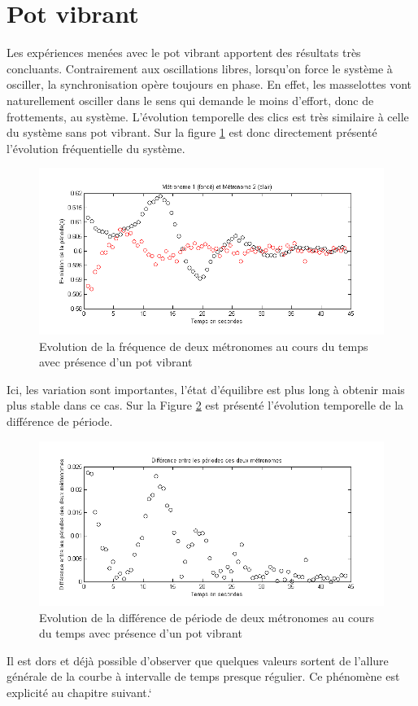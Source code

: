\documentclass[a4paper,11pt]{report}
\begin{document}
\section{Pot vibrant}
Les expériences menées avec le pot vibrant apportent des résultats très concluants. Contrairement aux oscillations libres, lorsqu'on force le système à osciller, la synchronisation opère toujours en phase. En effet, les masselottes vont naturellement osciller dans le sens qui demande le moins d'effort, donc de frottements, au système. L'évolution temporelle des clics est très similaire à celle du système sans pot vibrant. Sur la figure \ref{SynchroFP} est donc directement présenté l'évolution fréquentielle du système.
\begin{figure}[h]
\centering
\includegraphics[width=1\textwidth]{PotVibrant_Synchro_Frequence_200BPM}
\caption{Evolution de la fréquence de deux métronomes au cours du temps avec présence d'un pot vibrant}
\label{SynchroFP}
\end{figure}
Ici, les variation sont importantes, l'état d'équilibre est plus long à obtenir mais plus stable dans ce cas. Sur la Figure \ref{SynchroPP} est présenté l'évolution temporelle de la différence de période.
\begin{figure}[!h]
\centering
\includegraphics[width=1\textwidth]{PotVibrant_Synchro_Periode_200BPM}
\caption{Evolution de la différence de période de deux métronomes au cours du temps avec présence d'un pot vibrant}
\label{SynchroPP}
\end{figure}
Il est dors et déjà possible d'observer que quelques valeurs sortent de l'allure générale de la courbe à intervalle de temps presque régulier. Ce phénomène est explicité au chapitre suivant.`
\end{document}
